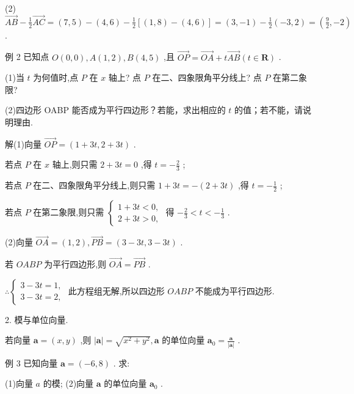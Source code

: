 \documentclass[10pt]{article}
\begin{document}
(2) \(\overrightarrow{AB} - \frac{1}{2}\overrightarrow{AC} = \left( {7,5}\right)  - \left( {4,6}\right)  - \frac{1}{2}\left\lbrack  {\left( {1,8}\right)  - \left( {4,6}\right) }\right\rbrack   = \left( {3, - 1}\right)  - \frac{1}{2}\left( {-3,2}\right)  = \left( {\frac{9}{2}, - 2}\right)\) .

例 2 已知点 \(O\left( {0,0}\right) ,A\left( {1,2}\right) ,B\left( {4,5}\right)\) ,且 \(\overrightarrow{OP} = \overrightarrow{OA} + t\overrightarrow{AB}\left( {t \in  \mathbf{R}}\right)\) .

(1)当 \(t\) 为何值时,点 \(P\) 在 \(x\) 轴上? 点 \(P\) 在二、四象限角平分线上? 点 \(P\) 在第二象限?

(2)四边形 OABP 能否成为平行四边形？若能，求出相应的 \(t\) 的值；若不能，请说明理由.

解(1)向量 \(\overrightarrow{OP} = \left( {1 + {3t},2 + {3t}}\right)\) .

若点 \(P\) 在 \(x\) 轴上,则只需 \(2 + {3t} = 0\) ,得 \(t =  - \frac{2}{3}\) ;

若点 \(P\) 在二、四象限角平分线上,则只需 \(1 + {3t} =  - \left( {2 + {3t}}\right)\) ,得 \(t =  - \frac{1}{2}\) ;

若点 \(P\) 在第二象限,则只需 \(\left\{  \begin{array}{l} 1 + {3t} < 0, \\  2 + {3t} > 0, \end{array}\right.\) 得 \(- \frac{2}{3} < t <  - \frac{1}{3}\) .

(2)向量 \(\overrightarrow{OA} = \left( {1,2}\right) ,\overrightarrow{PB} = \left( {3 - {3t},3 - {3t}}\right)\) .

若 \({OABP}\) 为平行四边形,则 \(\overrightarrow{OA} = \overrightarrow{PB}\) .

\(\therefore \left\{  \begin{array}{l} 3 - {3t} = 1, \\  3 - {3t} = 2, \end{array}\right.\) 此方程组无解,所以四边形 \({OABP}\) 不能成为平行四边形.

2. 模与单位向量.

若向量 \(\mathbf{a} = \left( {x,y}\right)\) ,则 \(\left| \mathbf{a}\right|  = \sqrt{{x}^{2} + {y}^{2}},\mathbf{a}\) 的单位向量 \({\mathbf{a}}_{0} = \frac{\mathbf{a}}{\left| \mathbf{a}\right| }\) .

例 3 已知向量 \(\mathbf{a} = \left( {-6,8}\right)\) . 求:

(1)向量 \(a\) 的模; (2)向量 \(\mathbf{a}\) 的单位向量 \({\mathbf{a}}_{0}\) .
\end{document}
